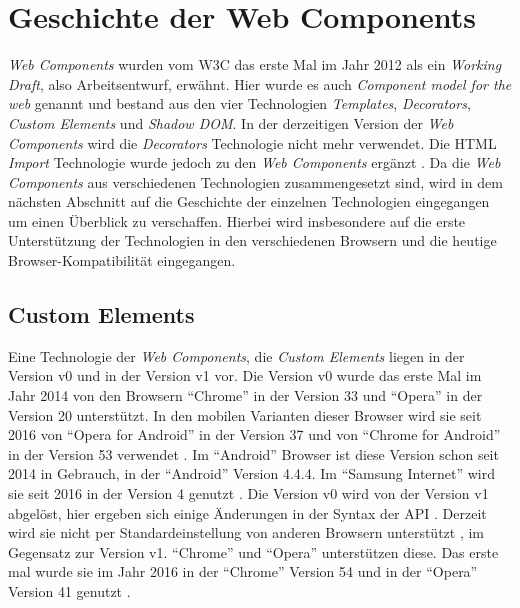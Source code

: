 \documentclass[12pt, paper=a4, bibtotoc, toc=listof, headsepline=true, numbers=endperiod]{scrreprt}
\begin{document}
	\section{Geschichte der Web Components}
	\label{ref:gesVonWebCom}
	\emph{Web Components} wurden vom \ac{W3C} das erste Mal im Jahr 2012 als ein \emph{Working Draft}, also Arbeitsentwurf, erwähnt. Hier wurde es auch \emph{Component model for the web} genannt und bestand aus den vier Technologien \emph{Templates}, \emph{Decorators}, \emph{Custom Elements} und \emph{Shadow DOM}. In der derzeitigen Version der \emph{Web Components} wird die \emph{Decorators} Technologie nicht mehr verwendet. Die \ac{HTML} \emph{Import} Technologie wurde jedoch zu den \emph{Web Components} ergänzt \cite{Cooney2012}. Da die \emph{Web Components} aus verschiedenen Technologien zusammengesetzt sind, wird in dem nächsten Abschnitt auf die Geschichte der einzelnen Technologien eingegangen um einen Überblick zu verschaffen. Hierbei wird insbesondere auf die erste Unterstützung der Technologien in den verschiedenen Browsern und die heutige Browser-Kompatibilität eingegangen.
		\subsection{Custom Elements}
		Eine Technologie der \emph{Web Components}, die \emph{Custom Elements} liegen in der Version v0 und in der Version v1 vor. Die Version v0 wurde das erste Mal im Jahr 2014 von den Browsern \enquote{Chrome} in der Version 33 und \enquote{Opera} in der Version 20 unterstützt. In den mobilen Varianten dieser Browser  wird sie seit 2016 von \enquote{Opera for Android} in der Version 37 und von \enquote{Chrome for Android} in der Version 53 verwendet \cite{C2015}. Im \enquote{Android} Browser ist diese Version schon seit 2014 in Gebrauch, in der \enquote{Android} Version 4.4.4. Im \enquote{Samsung Internet} wird sie seit 2016 in der Version 4 genutzt \cite{cusEleCanIUse}. Die Version v0 wird von der Version v1 abgelöst, hier ergeben sich einige Änderungen in der Syntax der \ac{API} \cite{Bidelman2016cusElev1}. Derzeit wird sie nicht per Standardeinstellung von anderen Browsern unterstützt \cite{firefox}, im Gegensatz zur Version v1. \enquote{Chrome} und \enquote{Opera} unterstützen diese. Das erste mal wurde sie im Jahr 2016 in der \enquote{Chrome} Version 54 und in der \enquote{Opera} Version 41 genutzt \cite{C2016}.
\end{document}
